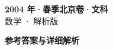 \documentclass[zihao=-4, a4paper]{ctexart}
\begin{document}
\begin{center}
  {\Large\bfseries 2004 年·春季北京卷·文科}\\[4pt]
  {\large 数学 · 解析版}
\end{center}
\medskip
{}

\clearpage
{}
\begin{center}{\Large\bfseries 参考答案与详细解析}\end{center}
\medskip

\end{document}
